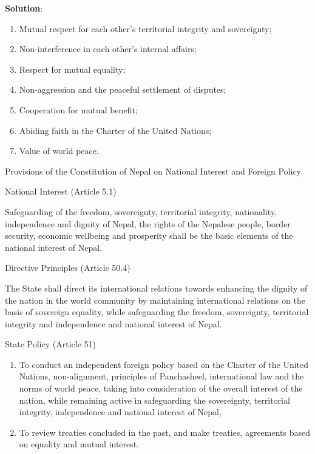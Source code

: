 \documentclass[
  openany]{book}
\newenvironment{solution}{ {\bfseries Solution}:}{}
\begin{document}
\begin{questions}
\begin{solution}
\begin{enumerate}
\item Mutual respect for each other’s territorial integrity and sovereignty;
\item Non-interference in each other’s internal affairs;
\item Respect for mutual equality;
\item Non-aggression and the peaceful settlement of disputes;
\item Cooperation for mutual benefit;
\item Abiding faith in the Charter of the United Nations;
\item Value of world peace.
\end{enumerate}

Provisions of the Constitution of Nepal on National Interest and Foreign Policy

National Interest (Article 5.1)

Safeguarding of the freedom, sovereignty, territorial integrity, nationality, independence and dignity of Nepal, the rights of the Nepalese people, border security, economic wellbeing and prosperity shall be the basic elements of the national interest of Nepal.

Directive Principles (Article 50.4)

The State shall direct its international relations towards enhancing the dignity of the nation in the world community by maintaining international relations on the basis of sovereign equality, while safeguarding the freedom, sovereignty, territorial integrity and independence and national interest of Nepal.

State Policy (Article 51)

\begin{enumerate}
\item To conduct an independent foreign policy based on the Charter of the United Nations, non-alignment, principles of Panchasheel, international law and the norms of world peace, taking into consideration of the overall interest of the nation, while remaining active in safeguarding the sovereignty, territorial integrity, independence and national interest of Nepal,
\item To review treaties concluded in the past, and make treaties, agreements based on equality and mutual interest.
\end{enumerate}


\end{solution}
\end{questions}
\end{document}
